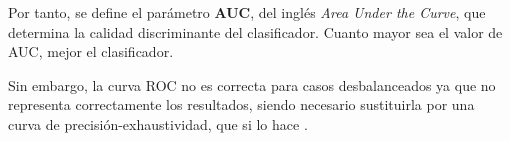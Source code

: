 Por tanto, se define el parámetro \textbf{AUC}, del inglés \textit{Area Under the Curve}, que determina la calidad discriminante del clasificador. Cuanto mayor sea el valor de AUC, mejor el clasificador.

Sin embargo, la curva ROC no es correcta para casos desbalanceados ya que no representa correctamente los resultados, siendo necesario sustituirla por una curva de precisión-exhaustividad, que si lo hace \cite{10.1371/journal.pone.0118432}.

%
%
%
%
%
%
%
%
%
%
